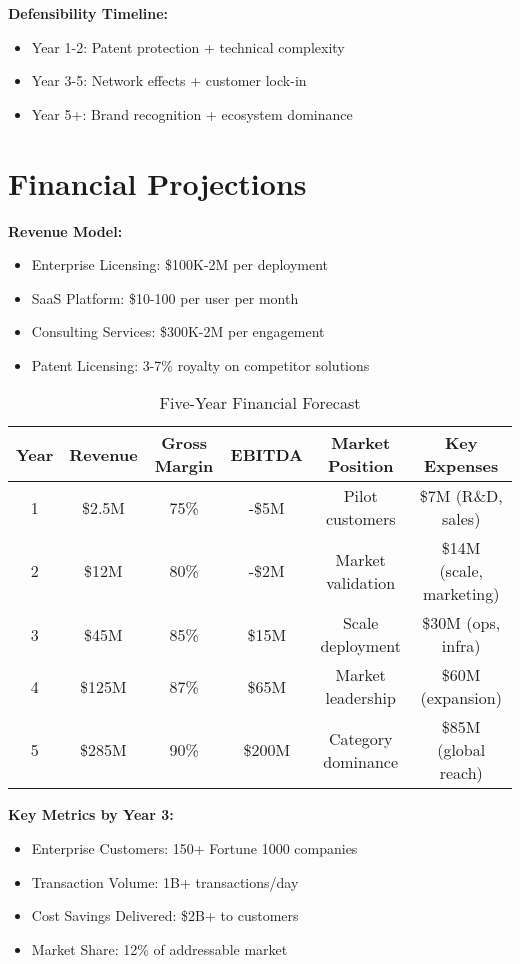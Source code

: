 \documentclass{article}
\begin{document}
\textbf{Defensibility Timeline:}
\begin{itemize}
    \item Year 1-2: Patent protection + technical complexity
    \item Year 3-5: Network effects + customer lock-in
    \item Year 5+: Brand recognition + ecosystem dominance
\end{itemize}

\section{Financial Projections}
\textbf{Revenue Model:}
\begin{itemize}
    \item Enterprise Licensing: \$100K-2M per deployment
    \item SaaS Platform: \$10-100 per user per month
    \item Consulting Services: \$300K-2M per engagement
    \item Patent Licensing: 3-7\% royalty on competitor solutions
\end{itemize}

\begin{table}[h]
\centering
\begin{tabular}{|c|c|c|c|c|c|}
\hline
\textbf{Year} & \textbf{Revenue} & \textbf{Gross Margin} & \textbf{EBITDA} & \textbf{Market Position} & \textbf{Key Expenses} \\
\hline
1 & \$2.5M & 75\% & -\$5M & Pilot customers & \$7M (R\&D, sales) \\
2 & \$12M & 80\% & -\$2M & Market validation & \$14M (scale, marketing) \\
3 & \$45M & 85\% & \$15M & Scale deployment & \$30M (ops, infra) \\
4 & \$125M & 87\% & \$65M & Market leadership & \$60M (expansion) \\
5 & \$285M & 90\% & \$200M & Category dominance & \$85M (global reach) \\
\hline
\end{tabular}
\caption{Five-Year Financial Forecast}
\end{table}

\textbf{Key Metrics by Year 3:}
\begin{itemize}
    \item Enterprise Customers: 150+ Fortune 1000 companies
    \item Transaction Volume: 1B+ transactions/day
    \item Cost Savings Delivered: \$2B+ to customers
    \item Market Share: 12\% of addressable market
\end{itemize}
\end{document}
